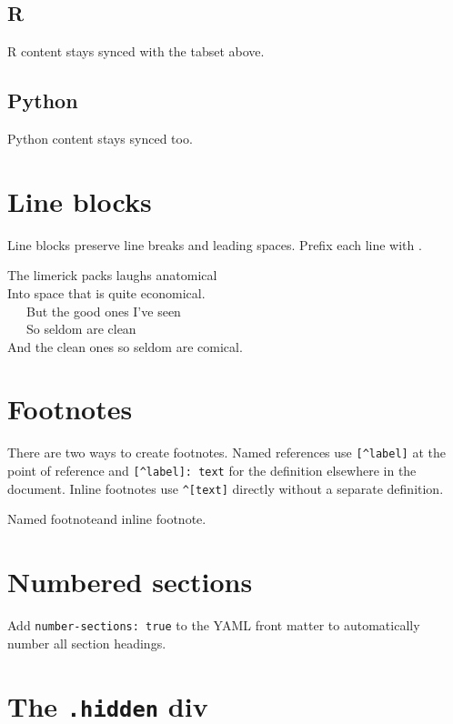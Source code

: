 \documentclass[11pt]{article}
\begin{document}
\subsection*{R}
\label{r}

R content stays synced with the tabset above.

\subsection*{Python}
\label{python}

Python content stays synced too.



\section*{Line blocks}
\label{line-blocks}

Line blocks preserve line breaks and leading spaces. Prefix each line with \texttt{\textbar{}}.

The limerick packs laughs anatomical\\
Into space that is quite economical.\\
~~~But the good ones I've seen\\
~~~So seldom are clean\\
And the clean ones so seldom are comical.

\section*{Footnotes}
\label{footnotes}

There are two ways to create footnotes. Named references use \texttt{{[}\^{}label{]}} at the point of reference and \texttt{{[}\^{}label{]}: text} for the definition elsewhere in the document. Inline footnotes use \texttt{\^{}{[}text{]}} directly without a separate definition.

Named footnote\footnotemark[1] and inline footnote\footnotemark[2].

\section*{Numbered sections}
\label{numbered-sections}

Add \texttt{number-sections: true} to the YAML front matter to automatically number all section headings.

\section*{The \texttt{.hidden} div}
\label{the-hidden-div}
\end{document}
